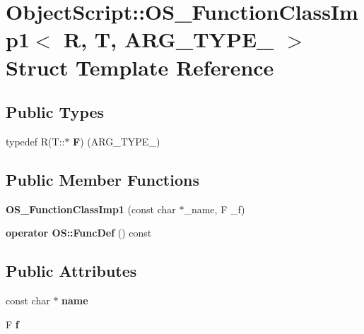 \hypertarget{struct_object_script_1_1_o_s___function_class_imp1}{}\section{Object\+Script\+:\+:O\+S\+\_\+\+Function\+Class\+Imp1$<$ R, T, A\+R\+G\+\_\+\+T\+Y\+P\+E\+\_ $>$ Struct Template Reference}
\label{struct_object_script_1_1_o_s___function_class_imp1}
\subsection*{Public Types}
\begin{DoxyCompactItemize}
\item 
typedef R(T\+::$\ast$ {\bfseries F}) (A\+R\+G\+\_\+\+T\+Y\+P\+E\+\_)\hypertarget{struct_object_script_1_1_o_s___function_class_imp1_adff77a96f2acd4d8d897f734fa7845bd}{}\label{struct_object_script_1_1_o_s___function_class_imp1_adff77a96f2acd4d8d897f734fa7845bd}

\end{DoxyCompactItemize}
\subsection*{Public Member Functions}
\begin{DoxyCompactItemize}
\item 
{\bfseries O\+S\+\_\+\+Function\+Class\+Imp1} (const char $\ast$\+\_\+name, F \+\_\+f)\hypertarget{struct_object_script_1_1_o_s___function_class_imp1_ad7c0d2e9052f65229b6e100775e1c69a}{}\label{struct_object_script_1_1_o_s___function_class_imp1_ad7c0d2e9052f65229b6e100775e1c69a}

\item 
{\bfseries operator O\+S\+::\+Func\+Def} () const \hypertarget{struct_object_script_1_1_o_s___function_class_imp1_adda324f384440c756681d2efaeb62b63}{}\label{struct_object_script_1_1_o_s___function_class_imp1_adda324f384440c756681d2efaeb62b63}

\end{DoxyCompactItemize}
\subsection*{Public Attributes}
\begin{DoxyCompactItemize}
\item 
const char $\ast$ {\bfseries name}\hypertarget{struct_object_script_1_1_o_s___function_class_imp1_ab960eb1d29af0e4405851ed159578001}{}\label{struct_object_script_1_1_o_s___function_class_imp1_ab960eb1d29af0e4405851ed159578001}

\item 
F {\bfseries f}\hypertarget{struct_object_script_1_1_o_s___function_class_imp1_af7c6aa1a117ca9355297cf9b497f114c}{}\label{struct_object_script_1_1_o_s___function_class_imp1_af7c6aa1a117ca9355297cf9b497f114c}

\end{DoxyCompactItemize}


